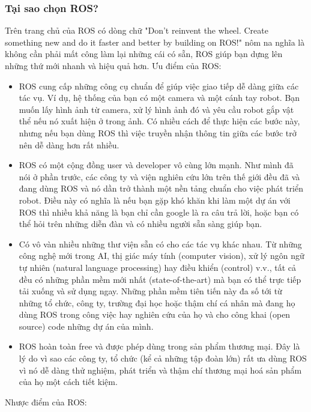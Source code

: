 \subsubsection{Tại sao chọn ROS?}
Trên trang chủ của ROS có dòng chữ "Don’t reinvent the wheel. Create something new and do it faster and better by building on ROS!" nôm na nghĩa là không cần phải mất công làm lại những cái có sẵn, ROS giúp bạn dựng lên những thứ mới nhanh và hiệu quả hơn.
Ưu điểm của ROS:
\begin{itemize}
    \item ROS cung cấp những công cụ chuẩn để giúp việc giao tiếp dễ dàng giữa các tác vụ. Ví dụ, hệ thống của bạn có một camera và một cánh tay robot. Bạn muốn lấy hình ảnh từ camera, xử lý hình ảnh đó và yêu cầu robot gắp vật thể nếu nó xuất hiện ở trong ảnh. Có nhiều cách để thực hiện các bước này, nhưng nếu bạn dùng ROS thì việc truyền nhận thông tin giữa các bước trở nên dễ dàng hơn rất nhiều.
    \item ROS có một cộng đồng user và developer vô cùng lớn mạnh. Như mình đã nói ở phần trước, các công ty và viện nghiên cứu lớn trên thế giới đều đã và đang dùng ROS và nó dần trở thành một nền tảng chuẩn cho việc phát triển robot. Điều này có nghĩa là nếu bạn gặp khó khăn khi làm một dự án với ROS thì nhiều khả năng là bạn chỉ cần google là ra câu trả lời, hoặc bạn có thể hỏi trên những diễn đàn và có nhiều người sẵn sàng giúp bạn.
    \item Có vô vàn nhiều những thư viện sẵn có cho các tác vụ khác nhau. Từ những công nghệ mới trong AI, thị giác máy tính (computer vision), xử lý ngôn ngữ tự nhiên (natural language processing) hay điều khiển (control) v.v., tất cả đều có những phần mềm mới nhất (state-of-the-art) mà bạn có thể trực tiếp tải xuống và sử dụng ngay. Những phần mềm tiên tiến này đa số tới từ những tổ chức, công ty, trường đại học hoặc thậm chí cá nhân mà đang họ dùng ROS trong công việc hay nghiên cứu của họ và cho công khai (open source) code những dự án của mình.
    \item ROS hoàn toàn free và được phép dùng trong sản phẩm thương mại. Đây là lý do vì sao các công ty, tổ chức (kể cả những tập đoàn lớn) rất ưa dùng ROS vì nó dễ dàng thử nghiệm, phát triển và thậm chí thương mại hoá sản phẩm của họ một cách tiết kiệm.
\end{itemize}
Nhược điểm của ROS:

